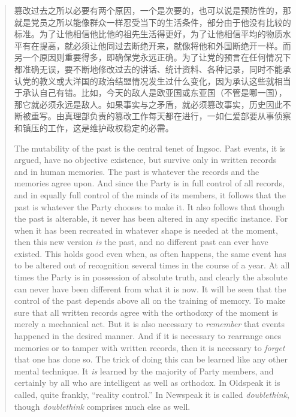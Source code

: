 \begin{paracol}{2}
\begin{quotation}
\switchcolumn

篡改过去之所以必要有两个原因，一个是次要的，也可以说是预防性的，那就是党员之所以能像群众一样忍受当下的生活条件，部分由于他没有比较的标准。为了让他相信他比他的祖先生活得更好，为了让他相信平均的物质水平有在提高，就必须让他同过去断绝开来，就像将他和外国断绝开一样。而另一个原因则重要得多，即确保党永远正确。为了让党的预言在任何情况下都准确无误，要不断地修改过去的讲话、统计资料、各种记录，同时不能承认党的教义或大洋国的政治结盟情况发生过什么变化，因为承认这些就相当于承认自己有错。比如，今天的敌人是欧亚国或东亚国（不管是哪一国），那它就必须永远是敌人。如果事实与之矛盾，就必须篡改事实，历史因此不断被重写。由真理部负责的篡改工作每天都在进行，一如仁爱部要从事侦察和镇压的工作，这是维护政权稳定的必需。

\switchcolumn*

The mutability of the past is the central tenet of Ingsoc. Past events,
it is argued, have no objective existence, but survive only in written
records and in human memories. The past is whatever the records and the
memories agree upon. And since the Party is in full control of all
records, and in equally full control of the minds of its members, it
follows that the past is whatever the Party chooses to make it. It also
follows that though the past is alterable, it never has been altered in
any specific instance. For when it has been recreated in whatever shape
is needed at the moment, then this new version \emph{is} the past, and
no different past can ever have existed. This holds good even when, as
often happens, the same event has to be altered out of recognition
several times in the course of a year. At all times the Party is in
possession of absolute truth, and clearly the absolute can never have
been different from what it is now. It will be seen that the control of
the past depends above all on the training of memory. To make sure that
all written records agree with the orthodoxy of the moment is merely a
mechanical act. But it is also necessary to \emph{remember} that events
happened in the desired manner. And if it is necessary to rearrange
one\textquotesingle s memories or to tamper with written records, then
it is necessary to \emph{forget} that one has done so. The trick of
doing this can be learned like any other mental technique. It \emph{is}
learned by the majority of Party members, and certainly by all who are
intelligent as well as orthodox. In Oldspeak it is called, quite
frankly, ``reality control.'' In Newspeak it is called \emph{doublethink},
though \emph{doublethink} comprises much else as well.


\end{quotation}
\end{paracol}

